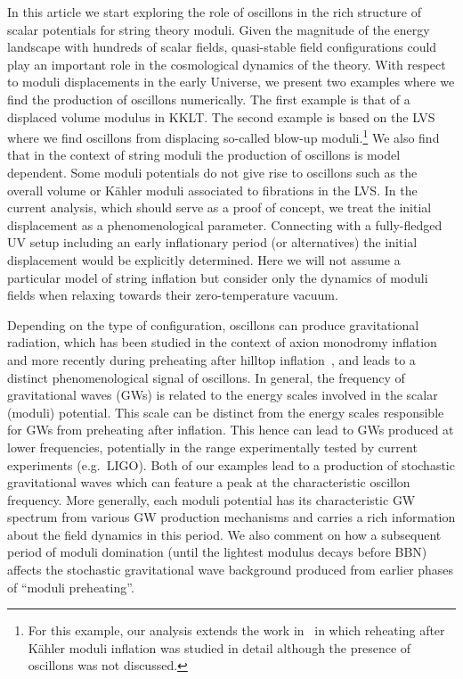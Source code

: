 \documentclass[12pt]{article}
\begin{document}
 In this article we start exploring the role of oscillons in the rich structure of scalar potentials for string theory moduli. Given the magnitude of the energy landscape with hundreds  of scalar fields,  quasi-stable field configurations could play an important role in the cosmological dynamics of the theory.
 With respect to moduli displacements in the early Universe, we present two examples where we find the production of oscillons numerically. The first example is that of a displaced volume modulus in KKLT. The second example is based on the LVS where we find oscillons from displacing so-called blow-up moduli.\footnote{For this example, our analysis extends the work in~\cite{Barnaby:2009wr} in which reheating after K\"ahler moduli inflation was studied in detail although the presence of oscillons was not discussed.}
 We also find that in the context of string moduli the production of oscillons is model dependent. Some moduli potentials do not give rise to oscillons such as the overall volume  or K\"ahler moduli associated to fibrations in the LVS. In the current analysis, which should serve as a proof of concept, we treat the initial displacement as a phenomenological parameter. Connecting with a fully-fledged UV setup including an early inflationary period (or alternatives) the initial displacement would be explicitly determined. Here we will not assume a  particular model of string inflation but consider only the dynamics of moduli fields when relaxing towards their zero-temperature vacuum. 

Depending on the type of  configuration, oscillons can produce gravitational radiation, which has been studied in the context of axion monodromy inflation~\cite{1304.6094} and more recently during preheating after hilltop inflation~\cite{Antusch:2016con}, and leads to a distinct phenomenological signal of oscillons. In general, the frequency of gravitational waves (GWs) is related to the energy scales involved in the scalar (moduli) potential. This scale can be distinct from the energy scales responsible for GWs from preheating after inflation. This hence can lead to GWs produced at lower frequencies, potentially in the range experimentally tested by current experiments (e.g.~LIGO). Both of our examples lead to a production of stochastic gravitational waves which can feature a peak at the characteristic oscillon frequency. More generally, each moduli potential has its characteristic GW spectrum from various GW production mechanisms and carries a rich information about the field dynamics in this period. We also comment on how a subsequent period of moduli domination (until the lightest modulus decays before BBN) affects the stochastic gravitational wave background produced from earlier phases of ``moduli preheating''.
\end{document}

